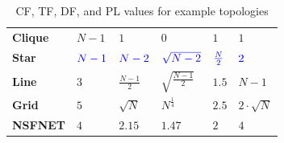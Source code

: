 \begin{table}[]
\centering
\begin{tabular}{l|l|l|l|l|l|}
\cline{2-6}
                            					 & \boldmath{$CF$}  			& \boldmath{$\mu_{TF}$}   			& \boldmath{$\sigma_{TF}$}										& \boldmath{$DF$}			& \boldmath{$PL_{max}$}	\\ \hline
\multicolumn{1}{|l|}{\textbf{Clique}} & $N-1$ & $1$ & $0$ & $1$ & $1$ \\ \hline
\multicolumn{1}{|l|}{{\color{blue}\textbf{Star}}} & ${\color{blue}N-1}$ & ${\color{blue}N-2}$ & ${\color{blue}\sqrt{N-2}}$ & ${\color{blue}\frac{N}{2}}$ & ${\color{blue}2}$  \\ \hline
\multicolumn{1}{|l|}{\textbf{Line}} & $3$ & $\frac{N-1}{2}$ & $\sqrt{\frac{N-1}{2}}$ & $1.5$ & $N-1$ \\ \hline
\multicolumn{1}{|l|}{\textbf{Grid}} & $5$ & $\sqrt{N}$ &$N^{\frac{1}{4}}$ &  $2.5$ & $2 \cdot \sqrt{N}$ \\ \hline
\multicolumn{1}{|l|}{{\color{blue}\textbf{NSFNET}}}  & {\color{blue}$4$}  & {\color{blue}$2.15$}  & {\color{blue}$1.47$} &  {\color{blue}$2$}  & {\color{blue}$4$}  \\ \hline
\end{tabular}
\vspace{1mm}
\caption{CF, TF, DF, and PL values for example topologies}
\label{table:rf_ff_sf_values}
    \vspace{-4mm}
\end{table}

